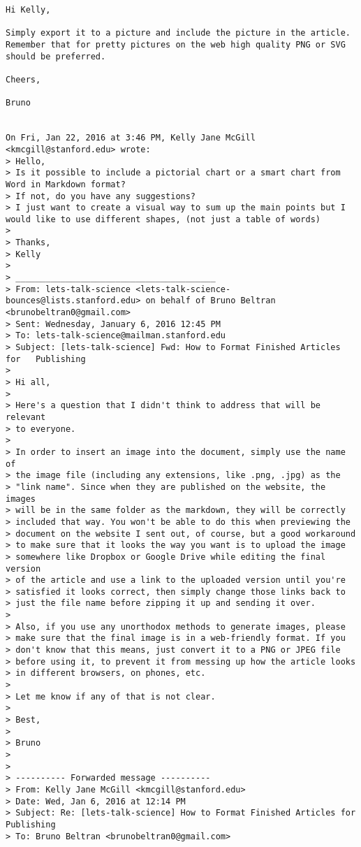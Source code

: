 \documentclass[paper=a4, fontsize=11pt]{scrartcl}
\numberwithin{equation}{section}        %
\numberwithin{figure}{section}            %
\numberwithin{table}{section}                %
\begin{document}
\begin{verbatim}
Hi Kelly,

Simply export it to a picture and include the picture in the article.
Remember that for pretty pictures on the web high quality PNG or SVG
should be preferred.

Cheers,

Bruno


On Fri, Jan 22, 2016 at 3:46 PM, Kelly Jane McGill <kmcgill@stanford.edu> wrote:
> Hello,
> Is it possible to include a pictorial chart or a smart chart from Word in Markdown format?
> If not, do you have any suggestions?
> I just want to create a visual way to sum up the main points but I would like to use different shapes, (not just a table of words)
>
> Thanks,
> Kelly
>
> ________________________________________
> From: lets-talk-science <lets-talk-science-bounces@lists.stanford.edu> on behalf of Bruno Beltran <brunobeltran0@gmail.com>
> Sent: Wednesday, January 6, 2016 12:45 PM
> To: lets-talk-science@mailman.stanford.edu
> Subject: [lets-talk-science] Fwd: How to Format Finished Articles for   Publishing
>
> Hi all,
>
> Here's a question that I didn't think to address that will be relevant
> to everyone.
>
> In order to insert an image into the document, simply use the name of
> the image file (including any extensions, like .png, .jpg) as the
> "link name". Since when they are published on the website, the images
> will be in the same folder as the markdown, they will be correctly
> included that way. You won't be able to do this when previewing the
> document on the website I sent out, of course, but a good workaround
> to make sure that it looks the way you want is to upload the image
> somewhere like Dropbox or Google Drive while editing the final version
> of the article and use a link to the uploaded version until you're
> satisfied it looks correct, then simply change those links back to
> just the file name before zipping it up and sending it over.
>
> Also, if you use any unorthodox methods to generate images, please
> make sure that the final image is in a web-friendly format. If you
> don't know that this means, just convert it to a PNG or JPEG file
> before using it, to prevent it from messing up how the article looks
> in different browsers, on phones, etc.
>
> Let me know if any of that is not clear.
>
> Best,
>
> Bruno
>
>
> ---------- Forwarded message ----------
> From: Kelly Jane McGill <kmcgill@stanford.edu>
> Date: Wed, Jan 6, 2016 at 12:14 PM
> Subject: Re: [lets-talk-science] How to Format Finished Articles for Publishing
> To: Bruno Beltran <brunobeltran0@gmail.com>

\end{verbatim}
\end{document}
